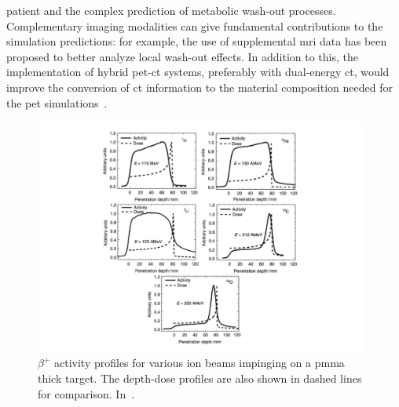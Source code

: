patient and the complex prediction of metabolic wash-out processes. Complementary imaging modalities can give fundamental contributions to the simulation predictions: for example, the use of supplemental \gls{mri} data has been proposed to better analyze local wash-out effects. In addition to this, the implementation of hybrid \gls{pet}-\gls{ct} systems, preferably with dual-energy \gls{ct}, would improve the conversion of \gls{ct} information to the material composition needed for the \gls{pet} simulations~\parencite{Landry2013}.  

\begin{figure}[!htbp]
\centering
\includegraphics[width=0.98\textwidth]{03_GraphicFiles/chapter1_Introduction/PETrangeProf.pdf}
\caption{$\beta^+$ activity profiles for various ion beams impinging on a \gls{pmma} thick target. The depth-dose profiles are also shown in dashed lines for comparison. In~\cite{Fiedler2012}.}
\label{chap1::fig::PETrangeProf}
\end{figure}   

